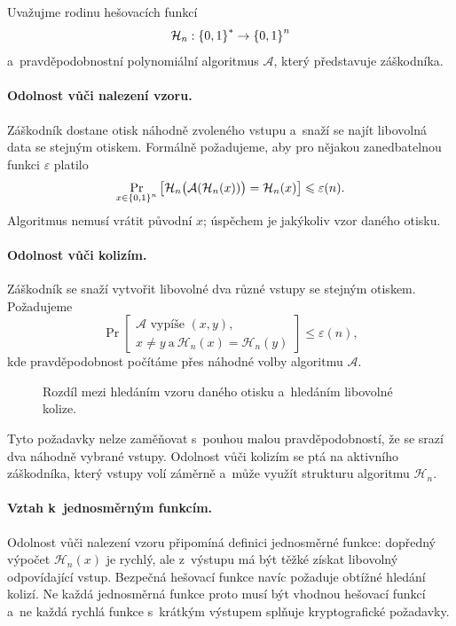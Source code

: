 Uvažujme rodinu hešovacích funkcí
\[
    \mathcal{H}_n:\left\{0,1\right\}^{*} \rightarrow \left\{0,1\right\}^{n}
\]
a~pravděpodobnostní polynomiální algoritmus $\mathcal A$, který představuje záškodníka.

\paragraph{Odolnost vůči nalezení vzoru.}
Záškodník dostane otisk náhodně zvoleného vstupu a~snaží se najít libovolná data se stejným otiskem. Formálně požadujeme, aby pro nějakou zanedbatelnou funkci $\varepsilon$ platilo
\[
    \Pr_{x\in\left\{0,1\right\}^{n}}
    \left[
        \mathcal{H}_n\bigl(\mathcal A(\mathcal{H}_n(x))\bigr)=\mathcal{H}_n(x)
    \right]
    \leqslant\varepsilon(n).
\]
Algoritmus nemusí vrátit původní $x$; úspěchem je jakýkoliv vzor daného otisku.

\paragraph{Odolnost vůči kolizím.}
Záškodník se snaží vytvořit libovolné dva různé vstupy se stejným otiskem. Požadujeme
\[
    \Pr\left[
        \begin{array}{c}
            \mathcal A\text{ vypíše }(x,y),\\
            x\neq y\ \text{a}\ \mathcal{H}_n(x)=\mathcal{H}_n(y)
        \end{array}
    \right]
    \leqslant\varepsilon(n),
\]
kde pravděpodobnost počítáme přes náhodné volby algoritmu $\mathcal A$.

\begin{figure}[ht]
    \centering
    
    \caption{Rozdíl mezi hledáním vzoru daného otisku a~hledáním libovolné kolize.}
    \label{fig:krypto-hash-vlastnosti}
\end{figure}

Tyto požadavky nelze zaměňovat s~pouhou malou pravděpodobností, že se srazí dva náhodně vybrané vstupy. Odolnost vůči kolizím se ptá na aktivního záškodníka, který vstupy volí záměrně a~může využít strukturu algoritmu $\mathcal{H}_n$.

\paragraph{Vztah k~jednosměrným funkcím.}

Odolnost vůči nalezení vzoru připomíná definici jednosměrné funkce: dopředný výpočet $\mathcal{H}_n(x)$ je rychlý, ale z~výstupu má být těžké získat libovolný odpovídající vstup. Bezpečná hešovací funkce navíc požaduje obtížné hledání kolizí. Ne každá jednosměrná funkce proto musí být vhodnou hešovací funkcí a~ne každá rychlá funkce s~krátkým výstupem splňuje kryptografické požadavky.

